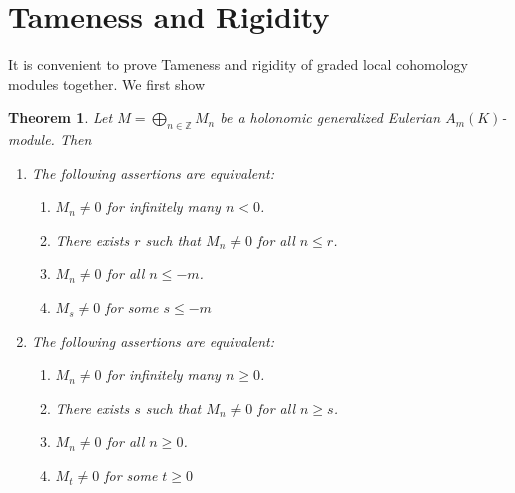 \documentclass{amsart}
\newcommand{\ZZ}{\mathbb{Z} }
\theoremstyle{plain}
\newtheorem{theorem}{Theorem}[section]
\theoremstyle{definition}
\theoremstyle{remark}
\begin{document}
 \section{Tameness and Rigidity} 
 It is convenient to prove Tameness and rigidity of graded local cohomology modules together.
 We first show
 \begin{theorem}
  \label{rig-tame-dim-0}
  Let $M = \bigoplus_{n \in \ZZ} M_n$ be a holonomic generalized Eulerian $A_m(K)$-module. Then
  \begin{enumerate}[\rm (I)]
   \item The following assertions are equivalent:
   \begin{enumerate}[\rm (a)]
    \item $M_n \neq 0$ for infinitely many  $n < 0$.
    \item There exists $r$ such that $M_n \neq 0$ for all $n \leq r$.
    \item $M_n \neq 0$ for \emph{all} $n \leq -m$.
    \item
    $M_s \neq 0$ for \emph{some} $s \leq -m$
   \end{enumerate}
 \item The following assertions are equivalent:
 \begin{enumerate}[\rm (a)]
  \item $M_n \neq 0$ for infinitely many $n \geq 0$.
  \item There exists $s$ such that $M_n \neq 0$ for all $n \geq s$.
  \item $M_n \neq 0$ for \emph{all} $n \geq 0$.
  \item $M_t \neq 0$ for \emph{some} $t \geq 0$
 \end{enumerate}
\end{enumerate}
 \end{theorem}
\end{document}
